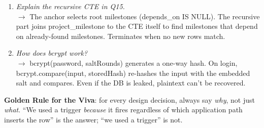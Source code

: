 \documentclass[11pt,a4paper]{article}
\begin{document}
\begin{enumerate}[nosep, leftmargin=2em, itemsep=2pt]
  \item \textit{Explain the recursive CTE in Q15.} \\
        $\to$ The anchor selects root milestones (depends\_on IS NULL). The recursive part
        joins project\_milestone to the CTE itself to find milestones that depend on
        already-found milestones. Terminates when no new rows match.

  \item \textit{How does bcrypt work?} \\
        $\to$ bcrypt(password, saltRounds) generates a one-way hash. On login,
        bcrypt.compare(input, storedHash) re-hashes the input with the embedded salt
        and compares. Even if the DB is leaked, plaintext can't be recovered.
\end{enumerate}

\vspace{8pt}
\begin{keybox}
\textbf{Golden Rule for the Viva}: for every design decision, always say \textit{why},
not just \textit{what}. ``We used a trigger \textit{because} it fires regardless of which
application path inserts the row'' is the answer; ``we used a trigger'' is not.
\end{keybox}
\end{document}
